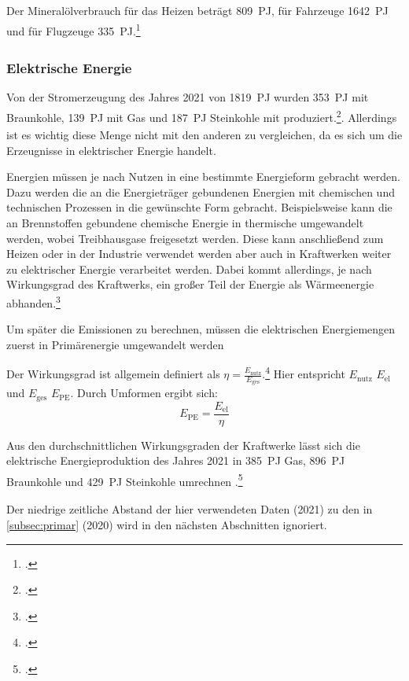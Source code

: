 \documentclass[12pt, ngerman]{article}
\newcommand{\pe}{_{\text{PE}}}
\newcommand{\el}{_{\text{el}}}
\begin{document}
    Der Mineralölverbrauch für das Heizen beträgt \qty{809}{PJ\pe}, für Fahrzeuge \qty{1642}{PJ\pe}
    und für Flugzeuge \qty{335}{PJ\pe}.\footcite{Energieflussbild2020PJLang,
        wilkeEndenergieverbrauchUndEnergieeffizienz2013}

    \subsubsection{Elektrische Energie}

    Von der Stromerzeugung des Jahres 2021 von \qty{1819}{PJ\el} wurden \qty{353}{PJ\el} mit Braunkohle,
    \qty{139}{PJ\el} mit Gas und \qty{187}{PJ\el} Steinkohle mit produziert.\footcite{SMARDEntwicklungenIm}.
    Allerdings ist es wichtig diese Menge nicht mit den anderen zu vergleichen, da es sich um die Erzeugnisse in
    elektrischer Energie handelt.

    Energien müssen je nach Nutzen in eine bestimmte Energieform gebracht werden.
    Dazu werden die an die Energieträger gebundenen Energien mit chemischen und technischen Prozessen in die
    gewünschte Form gebracht.
    Beispielsweise kann die an Brennstoffen gebundene chemische Energie in thermische umgewandelt werden, wobei
    Treibhausgase freigesetzt werden.
    Diese kann anschließend zum Heizen oder in der Industrie verwendet werden aber auch in Kraftwerken weiter zu
    elektrischer Energie verarbeitet werden.
    Dabei kommt allerdings, je nach Wirkungsgrad des Kraftwerks,
    ein großer Teil der Energie als Wärmeenergie abhanden.\footcite{AachenHatEnergie}

    Um später die Emissionen zu berechnen, müssen die elektrischen Energiemengen zuerst in Primärenergie umgewandelt
    werden

    Der Wirkungsgrad \unit{\eta} ist allgemein definiert als
    \(\eta=\frac{E_{\text{nutz}}}{E_{\text{ges}}}\).\footcite{WirkungsgradLEIFIphysik}
    Hier entspricht \(E_\text{nutz}\) \(E\el\) und \(E_\text{{ges}}\) \(E\pe\).
    Durch Umformen ergibt sich: \[E\pe=\frac{E\el}{\eta}\]



    Aus den durchschnittlichen Wirkungsgraden der Kraftwerke lässt sich die elektrische Energieproduktion des Jahres
    2021 in \qty{385}{PJ\pe} Gas,
    \qty{896}{PJ\pe} Braunkohle und \qty{429}{PJ\pe} Steinkohle umrechnen
    .\footcite{wilkeKraftwerkeKonventionelleUnd2013}

    Der niedrige zeitliche Abstand der hier verwendeten Daten (2021) zu den in \cref{subsec:primar} (2020)
    wird in den nächsten Abschnitten ignoriert.
\end{document}
